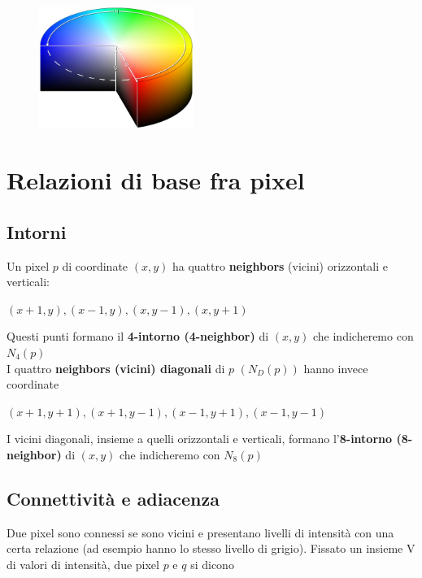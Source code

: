 \begin{figure}[H]
    \centering
    \includegraphics[width=5cm, keepaspectratio]{capitoli/immagini/imgs/cilindro_hsv.jpg}
\end{figure}


\section{Relazioni di base fra pixel}

\subsection{Intorni}

Un pixel $p$ di coordinate $(x,y)$ ha quattro \textbf{neighbors} (vicini)
orizzontali e verticali:

\begin{center}
    $(x+1, y), (x-1, y), (x, y-1), (x, y+1)$
\end{center}

Questi punti formano il \textbf{4-intorno (4-neighbor)} di $(x,y)$ che
indicheremo con $N_4(p)$ \\I quattro \textbf{neighbors (vicini) diagonali} di
$p$ $(N_D(p))$ hanno invece coordinate

\begin{center}
    $(x+1, y+1), (x+1,y-1), (x-1, y+1), (x-1, y-1)$
\end{center}

I vicini diagonali, insieme a quelli orizzontali e verticali, formano
l'\textbf{8-intorno (8-neighbor)} di $(x,y)$  che indicheremo con $N_8(p)$

\subsection{Connettività e adiacenza}

Due pixel sono connessi se sono vicini e presentano livelli di intensità con una
certa relazione (ad esempio hanno lo stesso livello di grigio). Fissato un
insieme V di valori di intensità, due pixel $p$ e $q$ si dicono

